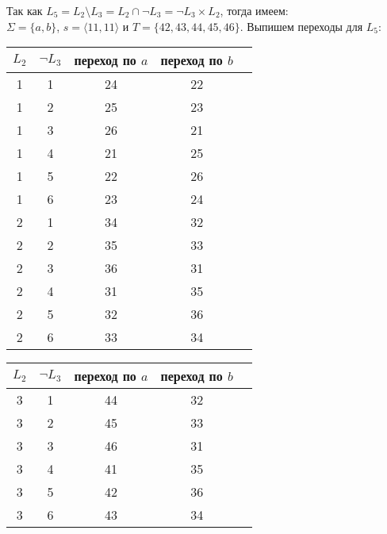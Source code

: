 \documentclass{article}
\begin{document}
\begin{enumerate}
        Так как \(L_5= L_2 \setminus L_3 = L_2 \cap \neg L_3 = \neg L_3 \times L_2\), тогда имеем:\\ \(\Sigma=\{a,b\}\), \(s=\langle11,11\rangle\) и \(T=\{42, 43, 44, 45, 46\}\). Выпишем переходы для \(L_5\): 
        \begin{center}
            \begin{tabular}{ |c|c|c|c|c| } 
                \hline
                \(L_2\) & \(\neg L_3\) & переход по \(a\) & переход по \(b\) \\
                \hline\hline
                1 & 1 & 24 & 22 \\
                \hline 
                1 & 2 & 25 & 23 \\
                \hline
                1 & 3 & 26 & 21 \\
                \hline
                1 & 4 & 21 & 25 \\
                \hline
                1 & 5 & 22 & 26 \\
                \hline
                1 & 6 & 23 & 24 \\
                \hline\hline
                
                2 & 1 & 34 & 32 \\
                \hline
                2 & 2 & 35 & 33 \\
                \hline
                2 & 3 & 36 & 31 \\
                \hline
                2 & 4 & 31 & 35 \\
                \hline
                2 & 5 & 32 & 36 \\
                \hline
                2 & 6 & 33 & 34 \\
                \hline
            \end{tabular} \:\:
            \begin{tabular}{ |c|c|c|c|c| } 
                \hline
                \(L_2\) & \(\neg L_3\) & переход по \(a\) & переход по \(b\) \\
                \hline\hline
                3 & 1 & 44 & 32 \\
                \hline
                3 & 2 & 45 & 33 \\
                \hline
                3 & 3 & 46 & 31 \\
                \hline
                3 & 4 & 41 & 35 \\
                \hline
                3 & 5 & 42 & 36 \\
                \hline
                3 & 6 & 43 & 34 \\
                \hline\hline
                

\end{tabular}
\end{center}
\end{enumerate}
\end{document}
